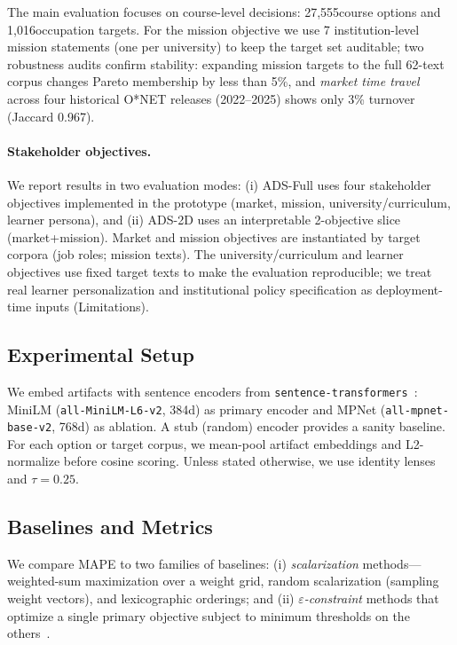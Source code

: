 \documentclass[sigconf,review]{acmart}
\newcommand{\NumCourses}{27,555}             %
\newcommand{\NumOccupations}{1,016}          %
\newcommand{\NumMissionsMain}{7}             %
\newcommand{\NumMissionsExpanded}{62}        %
\newcommand{\MarketDriftJaccard}{0.967}
\newcommand{\MarketDriftTurnover}{3\%}
\newcommand{\MAPE}{\textsc{MAPE}\xspace}
\begin{document}
The {main evaluation} focuses on course-level decisions: \NumCourses course options and \NumOccupations occupation targets. For the mission objective we use {\NumMissionsMain} institution-level mission statements (one per university) to keep the target set auditable; two robustness audits confirm stability: expanding mission targets to the full \NumMissionsExpanded-text corpus changes Pareto membership by less than 5\%, and \emph{market time travel} across four historical O*NET releases (2022--2025) shows only {\MarketDriftTurnover} turnover (Jaccard {\MarketDriftJaccard}).

\paragraph{Stakeholder objectives.}
We report results in two evaluation modes:
(i) {ADS-Full} uses four stakeholder objectives implemented in the prototype (market, mission, university/curriculum, learner persona), and
(ii) {ADS-2D} uses an interpretable 2-objective slice (market+mission).
Market and mission objectives are instantiated by target corpora (job roles; mission texts). The university/curriculum and learner objectives use fixed target texts to make the evaluation reproducible; we treat real learner personalization and institutional policy specification as deployment-time inputs (Limitations).

\subsection{Experimental Setup}
We embed artifacts with sentence encoders from \texttt{sentence-transformers}~\cite{reimers2019sentencebert}: MiniLM (\texttt{all-MiniLM-L6-v2}, 384d) as primary encoder and MPNet (\texttt{all-mpnet-base-v2}, 768d) as ablation. A stub (random) encoder provides a sanity baseline. For each option or target corpus, we mean-pool artifact embeddings and L2-normalize before cosine scoring. Unless stated otherwise, we use identity lenses and $\tau{=}0.25$.

\subsection{Baselines and Metrics}
We compare \MAPE to two families of baselines: (i) \emph{scalarization} methods---weighted-sum maximization over a weight grid, random scalarization (sampling weight vectors), and lexicographic orderings; and (ii) \emph{$\varepsilon$-constraint} methods that optimize a single primary objective subject to minimum thresholds on the others~\cite{miettinen1999nonlinearMOO}.
\end{document}
